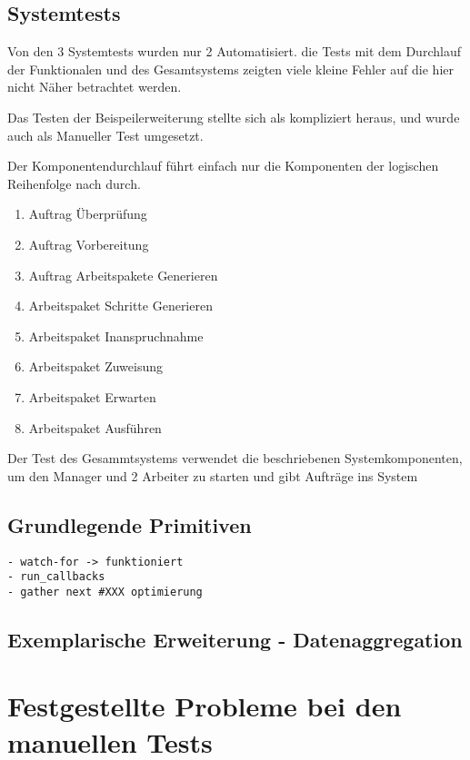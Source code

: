 \subsection{Systemtests}

Von den 3 Systemtests wurden nur 2 Automatisiert.
die Tests mit dem Durchlauf der Funktionalen  und des Gesamtsystems
zeigten viele kleine Fehler auf die hier nicht Näher betrachtet werden.

Das Testen der Beispeilerweiterung stellte sich als kompliziert heraus, und wurde auch als Manueller Test umgesetzt.

Der Komponentendurchlauf führt einfach nur die Komponenten der logischen Reihenfolge nach durch.
\begin{enumerate}
    \item Auftrag Überprüfung
    \item Auftrag Vorbereitung
    \item Auftrag Arbeitspakete Generieren
    \item Arbeitspaket Schritte Generieren
    \item Arbeitspaket Inanspruchnahme
    \item Arbeitspaket Zuweisung
    \item Arbeitspaket Erwarten
    \item Arbeitspaket Ausführen
\end{enumerate}

Der Test des Gesammtsystems verwendet die beschriebenen Systemkomponenten, um den Manager und 2 Arbeiter zu starten und gibt Aufträge ins System

\subsection{Grundlegende Primitiven}

\begin{verbatim}
- watch-for -> funktioniert
- run_callbacks
- gather next #XXX optimierung
\end{verbatim}

\subsection{Exemplarische Erweiterung - Datenaggregation}

\section{Festgestellte Probleme bei den manuellen Tests}


